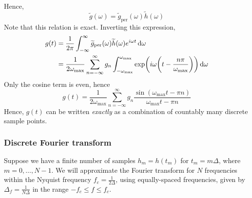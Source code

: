 \documentclass[a4paper]{article}
\begin{document}
Hence,
\[
	\widetilde g(\omega) = \widetilde g_\mathrm{per}(\omega) \widetilde h(\omega)
\]
Note that this relation is exact.
Inverting this expression,
\begin{align*}
	g(t) & = \frac{1}{2\pi} \int_{-\infty}^\infty \widetilde g_\mathrm{per}(\omega) \widetilde h(\omega) e^{i \omega t} \dd{\omega}                                     \\
	     & = \frac{1}{2\omega_{\max}} \sum_{n=-\infty}^\infty g_n \int_{-\omega_{\max}}^{\omega_{\max}} \exp(i \omega\qty(t - \frac{n \pi}{\omega_{\max}})) \dd{\omega}
\end{align*}
Only the cosine term is even, hence
\[
	g(t) = \frac{1}{2\omega_{\max}} \sum_{n=-\infty}^\infty g_n \frac{\sin(\omega_{\max} t - \pi n)}{\omega_{\max} t - \pi n}
\]
Hence, \( g(t) \) can be written \textit{exactly} as a combination of countably many discrete sample points.

\subsubsection{Discrete Fourier transform}
Suppose we have a finite number of samples \( h_m = h(t_m) \) for \( t_m = m \Delta \), where \( m = 0,\dots, N-1 \).
We will approximate the Fourier transform for \( N \) frequencies within the Nyquist frequency \( f_c = \frac{1}{2\Delta} \), using equally-spaced frequencies, given by \( \Delta_f = \frac{1}{N\Delta} \) in the range \( -f_c \leq f \leq f_c \).
\end{document}
